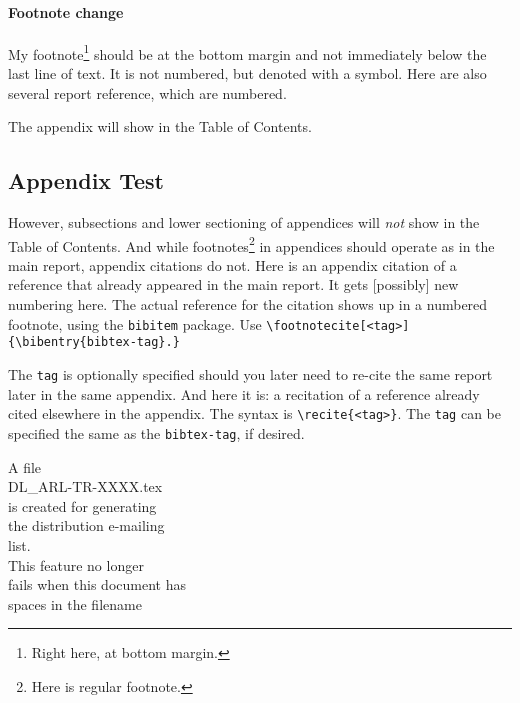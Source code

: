 \documentclass{arlticle}
\def\MandatoryDL{ARL-02-01-19(Unlimited).dls}
\begin{document}
\paragraph{Footnote change}
My footnote\footnote{Right here, at bottom margin.} should be at the 
  bottom margin and not immediately below the last line of text.
It is not numbered, but denoted with a symbol.
Here are also several report reference,\cite{segl98a,segl83} which 
  are numbered.



The appendix will show in the Table of Contents.

\subsection{Appendix Test}

However, subsections and lower sectioning of appendices will \textit{not} show
in the Table of Contents.
And while footnotes\footnote{Here is regular footnote.} in appendices
  should operate as in the main report, appendix citations do not.
Here is an appendix citation
  of a reference that already appeared in the main report.
It gets [possibly] new numbering here.  The actual reference for the
  citation shows up in a numbered footnote, using the \verb|bibitem|
  package.
Use \verb|\footnotecite[<tag>]{\bibentry{bibtex-tag}.}|

The \verb|tag| is optionally specified should you later need to re-cite
  the same report later in the same appendix.
And here it is: a recitation of a reference already 
  cited elsewhere in the appendix.
The syntax is \verb|\recite{<tag>}|.  
The \verb|tag| can be specified the same as the \verb|bibtex-tag|, if desired.

\distlistsetup
\begin{distributionlist}

A file\\
DL\_ARL-TR-XXXX.tex\\
is created for generating\\
the distribution e-mailing\\
list.\\
This feature no longer\\
fails when this document has\\
spaces in the filename
\end{distributionlist}
\distlistcleanup
\end{document}
